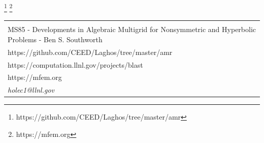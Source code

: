 \documentclass[8pt, compress]{beamer}
\newcommand{\pdv}[2]{\frac{\partial{#1}}{\partial{#2}}}
\newcommand{\vect}[1]{\boldsymbol{#1}}
\newcommand{\dI}{\text{d}}
\begin{document}
\begin{frame}
\begin{center}
\let\thefootnote\relax\footnote{https://github.com/CEED/Laghos/tree/master/amr}
\let\thefootnote\relax\footnote{https://mfem.org}
\end{center}
\begin{tabular}{l}
\hline\\
MS85 - Developments in Algebraic Multigrid for Nonsymmetric and Hyperbolic Problems - Ben S. Southworth \\
https://github.com/CEED/Laghos/tree/master/amr \\
https://computation.llnl.gov/projects/blast\\
https://mfem.org \\
\textit{holec1@llnl.gov}
\end{tabular}
\end{frame}

 %
\end{document}
